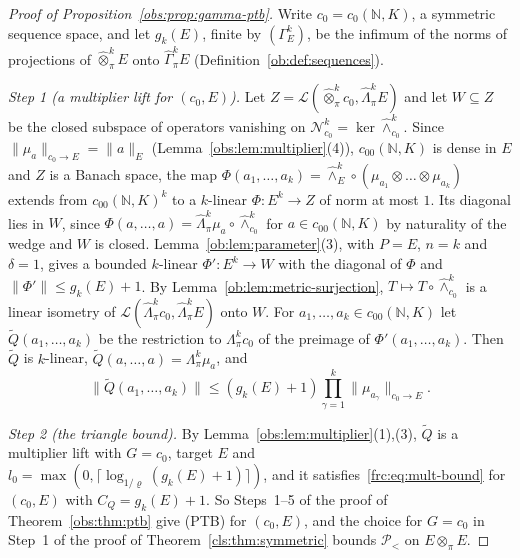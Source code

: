 \documentclass[11pt]{amsart}
\theoremstyle{definition}
\theoremstyle{remark}
\numberwithin{equation}{section}
\newcommand{\N}{\mathbb N}
\newcommand{\cL}{\mathcal L}
\newcommand{\norm}[1]{\lVert #1\rVert}
\theoremstyle{plain}
\theoremstyle{definition}
\theoremstyle{plain}
\newcommand{\cN}{\mathcal N}
\newcommand{\cP}{\mathcal P}
\begin{document}
\begin{proof}[Proof of Proposition~\ref{obs:prop:gamma-ptb}]
Write $c_0=c_0(\N,K)$, a symmetric sequence space, and let $g_k(E)$, finite by $(\Gamma^k_E)$, be the infimum of the norms
of projections of $\widehat\otimes^k_\pi E$ onto $\widehat\Gamma^k_\pi E$ (Definition~\ref{ob:def:sequences}).

\emph{Step 1 (a multiplier lift for $(c_0,E)$).} Let $Z=\cL(\widehat\otimes^k_\pi c_0,\widehat\Lambda^k_\pi E)$ and let
$W\subseteq Z$ be the closed subspace of operators vanishing on $\cN^k_{c_0}=\ker\widehat\wedge^k_{c_0}$. Since
$\norm{\mu_a}_{c_0\to E}=\norm a_E$ (Lemma~\ref{obs:lem:multiplier}(4)), $c_{00}(\N,K)$ is dense in $E$ and $Z$ is a Banach space, the map
$\Phi(a_1,\dots,a_k)=\widehat\wedge^k_E\circ(\mu_{a_1}\otimes\dots\otimes\mu_{a_k})$ extends from $c_{00}(\N,K)^k$ to a
$k$\nobreakdash-linear $\Phi\colon E^k\to Z$ of norm at most $1$. Its diagonal lies in $W$, since
$\Phi(a,\dots,a)=\widehat\Lambda^k_\pi\mu_a\circ\widehat\wedge^k_{c_0}$ for $a\in c_{00}(\N,K)$ by naturality of the wedge
and $W$ is closed. Lemma~\ref{ob:lem:parameter}(3), with $P=E$, $n=k$ and $\delta=1$, gives a bounded
$k$\nobreakdash-linear $\Phi'\colon E^k\to W$ with the diagonal of $\Phi$ and $\norm{\Phi'}\le g_k(E)+1$. By
Lemma~\ref{ob:lem:metric-surjection}, $T\mapsto T\circ\widehat\wedge^k_{c_0}$ is a linear isometry of
$\cL(\widehat\Lambda^k_\pi c_0,\widehat\Lambda^k_\pi E)$ onto $W$. For $a_1,\dots,a_k\in c_{00}(\N,K)$ let
$\widetilde Q(a_1,\dots,a_k)$ be the restriction to $\Lambda^k_\pi c_0$ of the preimage of $\Phi'(a_1,\dots,a_k)$. Then
$\widetilde Q$ is $k$\nobreakdash-linear, $\widetilde Q(a,\dots,a)=\Lambda^k_\pi\mu_a$, and
\[
 \norm{\widetilde Q(a_1,\dots,a_k)}\le(g_k(E)+1)\prod_{\gamma=1}^k\norm{\mu_{a_\gamma}}_{c_0\to E}.
\]

\emph{Step 2 (the triangle bound).} By Lemma~\ref{obs:lem:multiplier}(1),(3), $\widetilde Q$ is a multiplier lift with
$G=c_0$, target $E$ and $l_0=\max(0,\lceil\log_{1/\varrho}(g_k(E)+1)\rceil)$, and it satisfies~\eqref{frc:eq:mult-bound}
for $(c_0,E)$ with $C_Q=g_k(E)+1$. So Steps~1--5 of the proof of Theorem~\ref{obs:thm:ptb} give \textup{(PTB)} for
$(c_0,E)$, and the choice for $G=c_0$ in Step~1 of the proof of Theorem~\ref{cls:thm:symmetric} bounds $\cP_<$ on
$E\otimes_\pi E$.
\end{proof}
\end{document}
